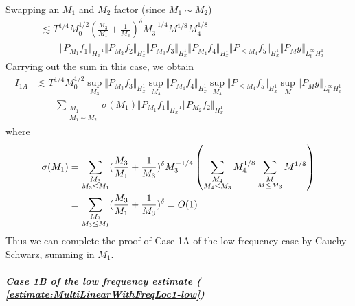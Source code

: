 \documentclass[12pt,letterpaper,leqno]{amsart}
\theoremstyle{plain}
\numberwithin{equation}{section}
\numberwithin{theorem}{section}
\numberwithin{proposition}{section}
\numberwithin{lemma}{section}
\numberwithin{corollary}{section}
\begin{document}
Swapping an $M_{1}$ and $M_{2}$ factor (since $M_{1}\sim M_{2}$) 
\begin{align*}
& \lesssim T^{1/4}M_{0}^{1/2}(\frac{M_{3}}{M_{1}}+\frac{1}{M_{3}})^{\delta
}M_{3}^{-1/4}M^{1/8}M_{4}^{1/8} \\
& \qquad \Vert P_{M_{1}}f_{1}\Vert _{H_{x}^{-1}}\Vert P_{M_{2}}f_{2}\Vert
_{H_{x}^{1}}\Vert P_{M_{3}}f_{3}\Vert _{H_{x}^{1}}\Vert P_{M_{4}}f_{4}\Vert
_{H_{x}^{1}}\Vert P_{\leq M_{4}}f_{5}\Vert _{H_{x}^{1}}\Vert P_{M}g\Vert
_{L_{t}^{\infty }H_{x}^{1}}
\end{align*}%
Carrying out the sum in this case, we obtain 
\begin{align*}
I_{1A}& \lesssim T^{1/4}M_{0}^{1/2}\sup_{M_{3}}\Vert P_{M_{3}}f_{3}\Vert
_{H_{x}^{1}}\sup_{M_{4}}\Vert P_{M_{4}}f_{4}\Vert
_{H_{x}^{1}}\sup_{M_{4}}\Vert P_{\leq M_{4}}f_{5}\Vert
_{H_{x}^{1}}\sup_{M}\Vert P_{M}g\Vert _{L_{t}^{\infty }H_{x}^{1}} \\
& \qquad \sum_{\substack{ M_{1}  \\ M_{1}\sim M_{2}}}\sigma (M_{1})\Vert
P_{M_{1}}f_{1}\Vert _{H_{x}^{-1}}\Vert P_{M_{2}}f_{2}\Vert _{H_{x}^{1}}
\end{align*}%
where 
\begin{align*}
\sigma (M_{1})& =\sum_{\substack{ M_{3}  \\ M_{3}\leq M_{1}}}(\frac{M_{3}}{%
M_{1}}+\frac{1}{M_{3}})^{\delta }M_{3}^{-1/4}\left( \sum_{\substack{ M_{4} 
\\ M_{4}\leq M_{3}}}M_{4}^{1/8}\sum_{\substack{ M  \\ M\leq M_{3}}}%
M^{1/8}\right) \\
& =\sum_{\substack{ M_{3}  \\ M_{3}\leq M_{1}}}(\frac{M_{3}}{M_{1}}+\frac{1}{%
M_{3}})^{\delta }=O(1)
\end{align*}%
Thus we can complete the proof of Case 1A of the low frequency case by
Cauchy-Schwarz, summing in $M_{1}$.

\subparagraph{\noindent \textit{Case 1B of the low frequency estimate (%
\protect\ref{estimate:MultiLinearWithFreqLoc1-low})}}
\end{document}

